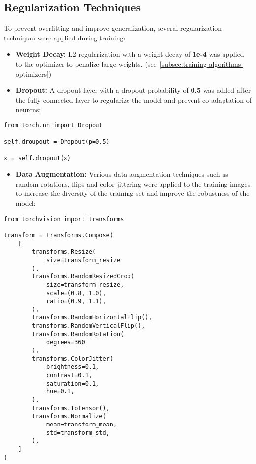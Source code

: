 \subsection{Regularization Techniques}

To prevent overfitting and improve generalization, several regularization techniques were applied during training:

\begin{itemize}
    \item \textbf{Weight Decay:} L2 regularization with a weight decay of \textbf{1e-4} was applied to the optimizer to penalize large weights. (see~\ref{subsec:training-algorithms-optimizers})
    \item \textbf{Dropout:} A dropout layer with a dropout probability of \textbf{0.5} was added after the fully connected layer to regularize the model and prevent co-adaptation of neurons:
\end{itemize}

\begin{minipage}{0.9\linewidth}\begin{lstlisting}[caption={Dropout layer with probability 0.5.},label={lst:dropout-layer}]
from torch.nn import Dropout

self.droupout = Dropout(p=0.5)

x = self.dropout(x)
\end{lstlisting}\end{minipage}

\begin{itemize}
    \item \textbf{Data Augmentation:} Various data augmentation techniques such as random rotations, flips and color jittering were applied to the training images to increase the diversity of the training set and improve the robustness of the model:
\end{itemize}

\begin{minipage}{0.9\linewidth}\begin{lstlisting}[caption={Data augmentation transforms.},label={lst:data-augmentation}]
from torchvision import transforms

transform = transforms.Compose(
    [
        transforms.Resize(
            size=transform_resize
        ),
        transforms.RandomResizedCrop(
            size=transform_resize,
            scale=(0.8, 1.0),
            ratio=(0.9, 1.1),
        ),
        transforms.RandomHorizontalFlip(),
        transforms.RandomVerticalFlip(),
        transforms.RandomRotation(
            degrees=360
        ),
        transforms.ColorJitter(
            brightness=0.1,
            contrast=0.1,
            saturation=0.1,
            hue=0.1,
        ),
        transforms.ToTensor(),
        transforms.Normalize(
            mean=transform_mean,
            std=transform_std,
        ),
    ]
)
\end{lstlisting}\end{minipage}